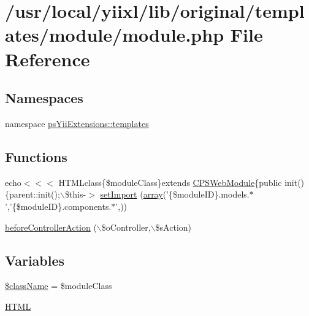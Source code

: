 \hypertarget{module_2module_8php}{
\section{/usr/local/yiixl/lib/original/templates/module/module.php File Reference}
\label{module_2module_8php}
}
\subsection*{Namespaces}
\begin{DoxyCompactItemize}
\item 
namespace \hyperlink{namespacepsYiiExtensions_1_1templates}{psYiiExtensions::templates}
\end{DoxyCompactItemize}
\subsection*{Functions}
\begin{DoxyCompactItemize}
\item 
echo$<$$<$$<$ HTMLclass\{\$moduleClass\}extends \hyperlink{classCPSWebModule}{CPSWebModule}\{public init()\{parent::init();$\backslash$\$this-\/$>$ \hyperlink{module_2module_8php_a06779d00cde6f35ba9d22ac574677489}{setImport} (\hyperlink{list_8php_aa3205d038c7f8feb5c9f01ac4dfadc88}{array}('\{\$moduleID\}.models.$\ast$','\{\$moduleID\}.components.$\ast$',))
\item 
\hyperlink{module_2module_8php_a26fb69cb51d443c69814cc38d965607e}{beforeControllerAction} ($\backslash$\$oController,$\backslash$\$sAction)
\end{DoxyCompactItemize}
\subsection*{Variables}
\begin{DoxyCompactItemize}
\item 
\hyperlink{module_2module_8php_acd6a475a6eeb092f4eea3e19e502d67d}{\$className} = \$moduleClass
\item 
\hyperlink{module_2module_8php_a2c8135527015cd4586959ac7c2ffec92}{HTML}
\end{DoxyCompactItemize}


